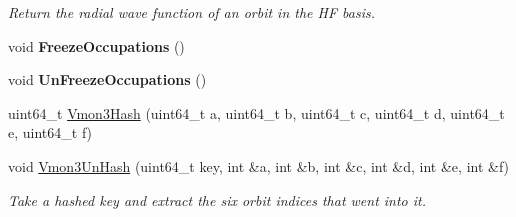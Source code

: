 \begin{DoxyCompactItemize}
\begin{DoxyCompactList}\small\item\em Return the radial wave function of an orbit in the HF basis. \end{DoxyCompactList}\item 
void {\bfseries Freeze\+Occupations} ()\hypertarget{classHartreeFock_a3fb9fc68d98aedc4cf1aae52da237339}{}\label{classHartreeFock_a3fb9fc68d98aedc4cf1aae52da237339}

\item 
void {\bfseries Un\+Freeze\+Occupations} ()\hypertarget{classHartreeFock_ab7aa734d2b1df54ddba236f279269fcc}{}\label{classHartreeFock_ab7aa734d2b1df54ddba236f279269fcc}

\item 
uint64\+\_\+t \hyperlink{classHartreeFock_ab863d5d020e15854d4d591ec0ce6a1a0}{Vmon3\+Hash} (uint64\+\_\+t a, uint64\+\_\+t b, uint64\+\_\+t c, uint64\+\_\+t d, uint64\+\_\+t e, uint64\+\_\+t f)
\item 
void \hyperlink{classHartreeFock_af675589807ed0369ce3c9ef30d9d625b}{Vmon3\+Un\+Hash} (uint64\+\_\+t key, int \&a, int \&b, int \&c, int \&d, int \&e, int \&f)\hypertarget{classHartreeFock_af675589807ed0369ce3c9ef30d9d625b}{}\label{classHartreeFock_af675589807ed0369ce3c9ef30d9d625b}

\begin{DoxyCompactList}\small\item\em Take a hashed key and extract the six orbit indices that went into it. \end{DoxyCompactList}\end{DoxyCompactItemize}
